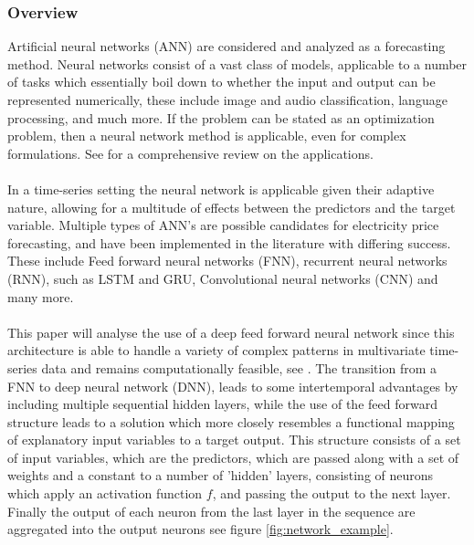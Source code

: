 \documentclass[10pt,a4paper]{article}
\numberwithin{equation}{section} %
\begin{document}
\subsubsection{Overview}
Artificial neural networks (ANN) are considered and analyzed as a forecasting method.
Neural networks consist of a vast class of models, applicable to a number of tasks which essentially boil down to whether the input and output can be represented numerically, these include image and audio classification, language processing, and much more. If the problem can be stated as an optimization problem,
then a neural network method is applicable, even for complex formulations. See \cite{abiodun2018state} for a comprehensive review on the applications.\\~\\
In a time-series setting the neural network is applicable given their adaptive nature, allowing for a multitude of effects between the predictors and the target variable.
Multiple types of ANN's are possible candidates for electricity price forecasting, and have been implemented in the literature with differing success. These include Feed forward neural networks (FNN), recurrent neural networks (RNN), such as LSTM and GRU, Convolutional neural networks (CNN) and many more.\\~\\
This paper will analyse the use of a deep feed forward neural network since this architecture is able to handle a variety of complex patterns in multivariate time-series data and remains computationally feasible, see \cite{DLforTimeSeries2020}. The transition from a FNN to deep neural 
network (DNN), leads to some intertemporal advantages by including multiple sequential hidden 
layers, while the use of the feed forward structure leads to a solution which more closely resembles a 
functional mapping of explanatory input variables to a target output. This structure consists of a set of input variables, which are the predictors, which are passed along with a set of weights and a constant to a number of 'hidden' layers, consisting of neurons which apply an activation function $f$, and passing the 
output to the next layer. Finally the output of each neuron from the last layer in the sequence are aggregated into the output neurons see figure \ref{fig:network_example}.\\
\end{document}
